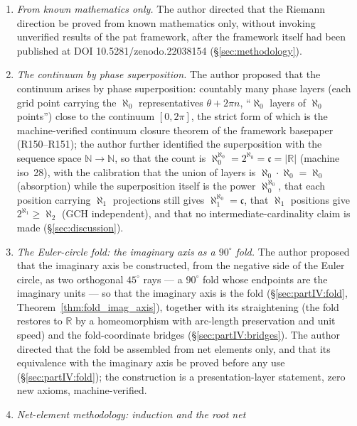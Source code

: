 \documentclass{article}
\begin{document}
\begin{enumerate}
phase-ambiguous multi-phase superpositions, that the method must cancel the
phases by cancellation operations, and posed the question whether a symmetry
group can be found that, after completion, exactly cancels the phases and
leaves the theorem (\S\ref{sec:methodology}, \S\ref{sec:discussion}).
\item \emph{From known mathematics only.} The author directed that the
Riemann direction be proved from known mathematics only, without invoking
unverified results of the pat framework, after the framework itself had
been published at DOI 10.5281/zenodo.22038154 (\S\ref{sec:methodology}).
\item \emph{The continuum by phase superposition.} The author proposed that
the continuum arises by phase superposition: countably many phase layers
(each grid point carrying the $\aleph_0$ representatives $\theta+2\pi n$,
``$\aleph_0$ layers of $\aleph_0$ points'') close to the continuum
$[0,2\pi]$, the strict form of which is the machine-verified continuum
closure theorem of the framework basepaper \cite{patbase} (R150--R151);
the author further identified the superposition with the sequence space
$\mathbb{N}\to\mathbb{N}$, so that the count is
$\aleph_0^{\aleph_0}=2^{\aleph_0}=\mathfrak c=|\mathbb{R}|$ (machine
iso~28), with the calibration that the union of layers is
$\aleph_0\cdot\aleph_0=\aleph_0$ (absorption) while the superposition
itself is the power $\aleph_0^{\aleph_0}$, that each position carrying
$\aleph_1$ projections still gives $\aleph_1^{\aleph_0}=\mathfrak c$,
that $\aleph_1$ positions give $2^{\aleph_1}\ge\aleph_2$ (GCH
independent), and that no intermediate-cardinality claim is made
(\S\ref{sec:discussion}).
\item \emph{The Euler-circle fold: the imaginary axis as a $90^\circ$
fold.} The author proposed that the imaginary axis be constructed,
from the negative side of the Euler circle, as two orthogonal
$45^\circ$ rays --- a $90^\circ$ fold whose endpoints are the
imaginary units --- so that the imaginary axis is the fold
(\S\ref{sec:partIV:fold}, Theorem~\ref{thm:fold_imag_axis}), together
with its straightening (the fold restores to $\mathbb R$ by a
homeomorphism with arc-length preservation and unit speed) and the
fold-coordinate bridges
(\S\ref{sec:partIV:bridges}). The author directed that the fold be
assembled from net elements only, and that its equivalence with the
imaginary axis be proved before any use
(\S\ref{sec:partIV:fold}); the construction is a presentation-layer
statement, zero new axioms, machine-verified.
\item \emph{Net-element methodology: induction and the root net
}
\end{enumerate}
\end{document}
